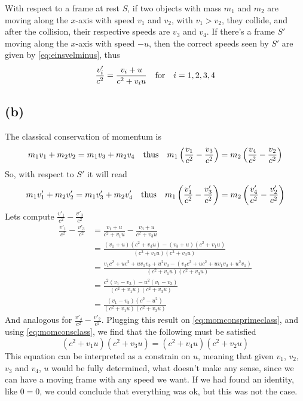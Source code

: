 \documentclass[oneside, 10pt, notitlepage]{book}
\begin{document}
With respect to a frame at rest \(S\), if two objects with mass \(m_1\) and \(m_2\) are moving along the \(x\)-axis with speed \(v_1\) and \(v_2\), with \(v_1 > v_2\), they collide, and after the collision, their respective speeds are \(v_3\) and \(v_4\). If there's a frame \(S'\) moving along the \(x\)-axis with speed \(-u\), then the correct speeds seen by \(S'\) are given by \eqref{eq:einsvelminus}, thus
\begin{equation}
    \frac{v'_i}{c^2} = \frac{v_i + u}{c^2 + v_i u} \qq{for} i = 1,2,3,4 
\end{equation}

\subsection*{(b)}
The classical conservation of momentum is
\begin{equation}\label{eq:momconsclass}
    m_1 v_1 + m_2 v_2 = m_1 v_3 + m_2 v_4 \qq{thus} m_1 \lr{\frac{v_1}{c^2}-\frac{v_3}{c^2}} = m_2 \lr{\frac{v_4}{c^2}-\frac{v_2}{c^2}}
\end{equation}
So, with respect to \(S'\) it will read
\begin{equation}\label{eq:momconsprimeclass}
    m_1 v'_1 + m_2 v'_2 = m_1 v'_3 + m_2 v'_4 \qq{thus} m_1 \lr{\frac{v'_1}{c^2}-\frac{v'_3}{c^2}} = m_2 \lr{\frac{v'_4}{c^2}-\frac{v'_2}{c^2}}
\end{equation}
Lets compute \(\frac{v'_1}{c^2}-\frac{v'_3}{c^2}\)
\begin{equation}
\begin{split}
    \frac{v'_1}{c^2}-\frac{v'_3}{c^2} &=  \frac{v_1 + u}{c^2 + v_1 u} - \frac{v_3 + u}{c^2 + v_3 u} \\ 
    &= \frac{(v_1 + u)(c^2 + v_3 u) - (v_3 + u)(c^2 + v_1 u)}{(c^2 + v_1 u)(c^2 + v_3 u)} \\
    &= \frac{v_1 c^2 + uc^2 + uv_1v_3 + u^2 v_3 - (v_3c^2 + uc^2 + uv_1v_3 + u^2 v_1)}{(c^2 + v_1 u)(c^2 + v_3 u)} \\
    &= \frac{c^2(v_1 - v_3) - u^2(v_1-v_3)}{(c^2 + v_1 u)(c^2 + v_3 u)} \\
    &= \frac{(v_1-v_3)(c^2 - u^2)}{(c^2 + v_1 u)(c^2 + v_3 u)}
\end{split}
\end{equation}
And analogous for \(\frac{v'_4}{c^2}-\frac{v'_2}{c^2}\). Plugging this result on \eqref{eq:momconsprimeclass}, and using \eqref{eq:momconsclass}, we find that the following must be satisfied
\begin{equation}
    (c^2 + v_1 u)(c^2 + v_3 u) = (c^2 + v_4 u)(c^2 + v_2 u)
\end{equation}
This equation can be interpreted as a constrain on \(u\), meaning that given \(v_1\), \(v_2\), \(v_3\) and \(v_4\), \(u\) would be fully determined, what doesn't make any sense, since we can have a moving frame with any speed we want. If we had found an identity, like \(0=0\), we could conclude that everything was ok, but this was not the case.
\end{document}
